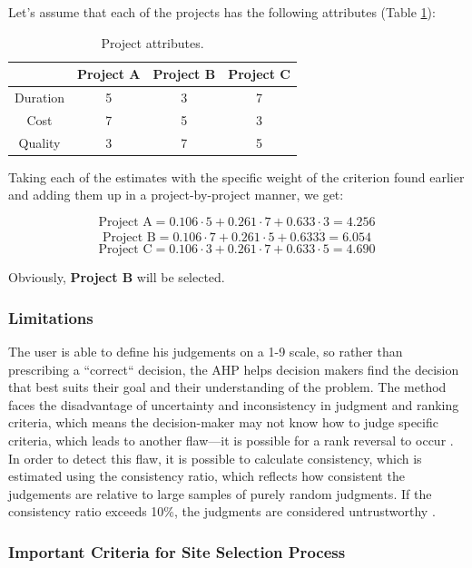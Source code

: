 Let's assume that each of the projects has the following attributes (Table \ref{tab:ahp-example-4}):

\begin{table}[ht]
\label{tab:ahp-example-4}
    \centering
    \begin{tabular}{|c|c|c|c|}
        \hline
         & Project A & Project B & Project C \\
        \hline
        Duration & 5 & 3 & 7 \\
        \hline
        Cost & 7 & 5 & 3 \\
        \hline
        Quality & 3 & 7 & 5 \\
        \hline
    \end{tabular}
    \caption{Project attributes.}
\end{table}

Taking each of the estimates with the specific weight of the criterion found earlier and adding them up in a project-by-project manner, we get:

$$\text{Project A} = 0.106 \cdot 5 + 0.261 \cdot 7 + 0.633 \cdot 3 = 4.256$$
$$\text{Project B} = 0.106 \cdot 7 + 0.261 \cdot 5 + 0.633 \dot 3 = 6.054$$
$$\text{Project C} = 0.106 \cdot 3 + 0.261 \cdot 7 + 0.633 \cdot 5 = 4.690$$


Obviously, \textbf{Project B} will be selected.

\subsubsection{Limitations}

 The user is able to define his judgements on a 1-9 scale, so rather than prescribing a ``correct`` decision, the AHP helps decision makers find the decision that best suits their goal and their understanding of the problem. The method faces the disadvantage of uncertainty and inconsistency in judgment and ranking criteria, which means the decision-maker may not know how to judge specific criteria, which leads to another flaw---it is possible for a rank reversal to occur \cite{taherdoost2023comprehensive}. In order to detect this flaw, it is possible to calculate consistency, which is estimated using the consistency ratio, which reflects how consistent the judgements are relative to large samples of purely random judgments. If the consistency ratio exceeds 10\%, the judgments are considered untrustworthy \cite{saaty1992decision}.

\subsubsection{Important Criteria for Site Selection Process}

